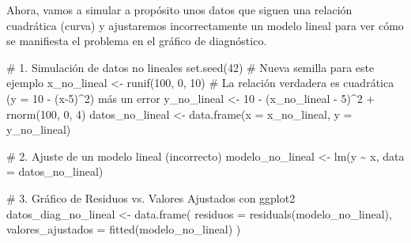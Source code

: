 \documentclass[
  letterpaper,
  DIV=11,
  numbers=noendperiod]{scrreprt}
\newenvironment{Shaded}{\begin{snugshade}}{\end{snugshade}}
\newcommand{\AttributeTok}[1]{\textcolor[rgb]{0.40,0.45,0.13}{#1}}
\newcommand{\CommentTok}[1]{\textcolor[rgb]{0.37,0.37,0.37}{#1}}
\newcommand{\DecValTok}[1]{\textcolor[rgb]{0.68,0.00,0.00}{#1}}
\newcommand{\FunctionTok}[1]{\textcolor[rgb]{0.28,0.35,0.67}{#1}}
\newcommand{\NormalTok}[1]{\textcolor[rgb]{0.00,0.23,0.31}{#1}}
\newcommand{\OtherTok}[1]{\textcolor[rgb]{0.00,0.23,0.31}{#1}}
\newcommand{\SpecialCharTok}[1]{\textcolor[rgb]{0.37,0.37,0.37}{#1}}
\begin{document}
\begin{tcolorbox}[enhanced jigsaw, breakable, toprule=.15mm, bottomtitle=1mm, coltitle=black, colbacktitle=quarto-callout-tip-color!10!white, titlerule=0mm, opacitybacktitle=0.6, bottomrule=.15mm, toptitle=1mm, title=\textcolor{quarto-callout-tip-color}{\faLightbulb}\hspace{0.5em}{Contraejemplo: Violación del supuesto de linealidad}, arc=.35mm, rightrule=.15mm, opacityback=0, colframe=quarto-callout-tip-color-frame, leftrule=.75mm, left=2mm, colback=white]

Ahora, vamos a simular a propósito unos datos que siguen una relación
cuadrática (curva) y ajustaremos incorrectamente un modelo lineal para
ver cómo se manifiesta el problema en el gráfico de diagnóstico.

\begin{Shaded}
\begin{Highlighting}[]
\CommentTok{\# 1. Simulación de datos no lineales}
\FunctionTok{set.seed}\NormalTok{(}\DecValTok{42}\NormalTok{) }\CommentTok{\# Nueva semilla para este ejemplo}
\NormalTok{x\_no\_lineal }\OtherTok{\textless{}{-}} \FunctionTok{runif}\NormalTok{(}\DecValTok{100}\NormalTok{, }\DecValTok{0}\NormalTok{, }\DecValTok{10}\NormalTok{)}
\CommentTok{\# La relación verdadera es cuadrática (y = 10 {-} (x{-}5)\^{}2) más un error}
\NormalTok{y\_no\_lineal }\OtherTok{\textless{}{-}} \DecValTok{10} \SpecialCharTok{{-}}\NormalTok{ (x\_no\_lineal }\SpecialCharTok{{-}} \DecValTok{5}\NormalTok{)}\SpecialCharTok{\^{}}\DecValTok{2} \SpecialCharTok{+} \FunctionTok{rnorm}\NormalTok{(}\DecValTok{100}\NormalTok{, }\DecValTok{0}\NormalTok{, }\DecValTok{4}\NormalTok{)}
\NormalTok{datos\_no\_lineal }\OtherTok{\textless{}{-}} \FunctionTok{data.frame}\NormalTok{(}\AttributeTok{x =}\NormalTok{ x\_no\_lineal, }\AttributeTok{y =}\NormalTok{ y\_no\_lineal)}

\CommentTok{\# 2. Ajuste de un modelo lineal (incorrecto)}
\NormalTok{modelo\_no\_lineal }\OtherTok{\textless{}{-}} \FunctionTok{lm}\NormalTok{(y }\SpecialCharTok{\textasciitilde{}}\NormalTok{ x, }\AttributeTok{data =}\NormalTok{ datos\_no\_lineal)}

\CommentTok{\# 3. Gráfico de Residuos vs. Valores Ajustados con ggplot2}
\NormalTok{datos\_diag\_no\_lineal }\OtherTok{\textless{}{-}} \FunctionTok{data.frame}\NormalTok{(}
  \AttributeTok{residuos =} \FunctionTok{residuals}\NormalTok{(modelo\_no\_lineal),}
  \AttributeTok{valores\_ajustados =} \FunctionTok{fitted}\NormalTok{(modelo\_no\_lineal)}
\NormalTok{)}


\end{Highlighting}
\end{Shaded}
\end{tcolorbox}
\end{document}
